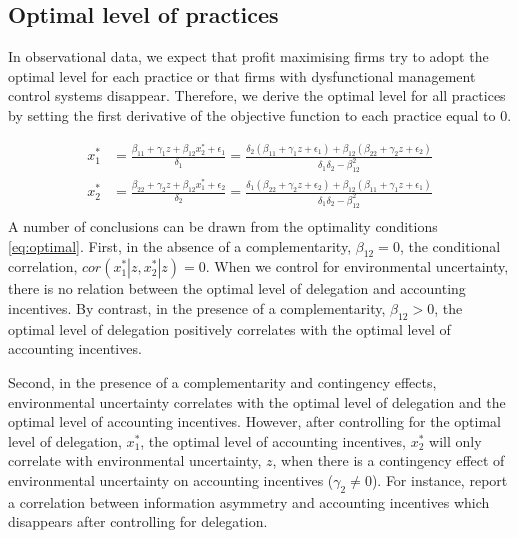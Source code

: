 \documentclass[12pt]{article}
\begin{document}
\subsection{Optimal level of practices}\label{optimal-practices}

In observational data, we expect that profit maximising firms try to adopt the optimal level for each practice or that firms with dysfunctional management control systems disappear. Therefore, we derive the optimal level for all practices by setting the first derivative of the objective function to each practice equal to 0.

\begin{equation}\label{eq:optimal}
\begin{aligned}
x_1^* &= \frac{\beta_{11} + \gamma_1 z + \beta_{12} x_2^*  + \epsilon_{1}}{\delta_1 }
		      = \frac{\delta_2 (\beta_{11} + \gamma_1 z + \epsilon_1) 
           					+ \beta_{12} (\beta_{22} + \gamma_2 z + \epsilon_2) }
                            {\delta_1 \delta_2 - \beta_{12}^2} \\
 x_2^* &= \frac{\beta_{22} + \gamma_2 z + \beta_{12} x_1^* + \epsilon_{2}}{\delta_2  }
		      =  \frac{\delta_1 (\beta_{22} + \gamma_2 z + \epsilon_2) 
           					+ \beta_{12} (\beta_{11} + \gamma_1 z + \epsilon_1) }
                            {\delta_1 \delta_2 - \beta_{12}^2} \\
\end{aligned}
\end{equation}
A number of conclusions can be drawn from the optimality conditions \eqref{eq:optimal}. First, in the absence of a complementarity, $\beta_{12} = 0$, the conditional correlation, $cor(x^*_1 | z, x^*_2 |z) = 0$. When we control for environmental uncertainty, there is no relation between the optimal level of delegation and accounting incentives. By contrast, in the presence of a complementarity, $\beta_{12} > 0$, the optimal level of delegation positively correlates with the optimal level of accounting incentives. 

Second, in the presence of a complementarity and contingency effects, environmental uncertainty correlates with the optimal level of delegation and the optimal level of accounting incentives.  However, after controlling for the optimal level of delegation, $x_1^*$, the optimal level of accounting incentives, $x_2^*$  will only correlate with environmental uncertainty, $z$, when there is a contingency effect of environmental uncertainty on accounting incentives ($\gamma_2 \neq 0$).  For instance, \citet{abernethy_determinants_2004} report a correlation between information asymmetry and accounting incentives which disappears after controlling for delegation.
\end{document}
